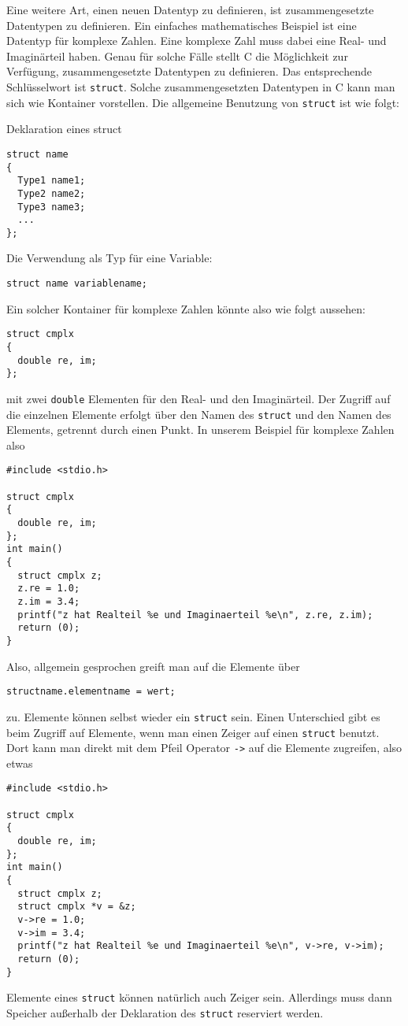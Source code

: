 Eine weitere Art, einen neuen Datentyp zu definieren, ist zusammengesetzte Datentypen zu definieren.
Ein einfaches mathematisches Beispiel ist eine Datentyp für komplexe Zahlen.
Eine komplexe Zahl muss dabei eine Real- und Imaginärteil haben.
Genau für solche Fälle stellt C die Möglichkeit zur Verfügung, zusammengesetzte Datentypen zu definieren.
Das entsprechende Schlüsselwort ist \verb|struct|.
Solche zusammengesetzten Datentypen in C kann man sich wie Kontainer vorstellen.
Die allgemeine Benutzung von \verb|struct| ist wie folgt:
\begin{myalertblock}{Deklaration eines struct}
\begin{lstlisting}
struct name
{
  Type1 name1;
  Type2 name2;
  Type3 name3;
  ...
};
\end{lstlisting}
  \vspace{-0.4cm}
  Die Verwendung als Typ für eine Variable:
\begin{lstlisting}
struct name variablename;
\end{lstlisting}
  \vspace{-0.4cm} 
\end{myalertblock}
Ein solcher Kontainer für komplexe Zahlen könnte also wie folgt aussehen:
\begin{lstlisting}
struct cmplx
{
  double re, im;
};
\end{lstlisting}
mit zwei \verb|double| Elementen für den Real- und den Imaginärteil. 
Der Zugriff auf die einzelnen Elemente erfolgt über den Namen des \verb|struct| und den Namen des Elements, getrennt durch einen Punkt.
In unserem Beispiel für komplexe Zahlen also 
\begin{lstlisting}
#include <stdio.h>

struct cmplx
{
  double re, im;
};
int main()
{
  struct cmplx z;
  z.re = 1.0;
  z.im = 3.4;
  printf("z hat Realteil %e und Imaginaerteil %e\n", z.re, z.im);
  return (0);
}
\end{lstlisting}
Also, allgemein gesprochen greift man auf die Elemente über 
\begin{lstlisting}
structname.elementname = wert;
\end{lstlisting}
zu.
Elemente können selbst wieder ein \verb|struct| sein.
Einen Unterschied gibt es beim Zugriff auf Elemente, wenn man einen Zeiger auf einen \verb|struct| benutzt.
Dort kann man direkt mit dem Pfeil Operator \verb|->| auf die Elemente zugreifen, also etwas
\begin{lstlisting}
#include <stdio.h>

struct cmplx
{
  double re, im;
};
int main()
{
  struct cmplx z;
  struct cmplx *v = &z;
  v->re = 1.0;
  v->im = 3.4;
  printf("z hat Realteil %e und Imaginaerteil %e\n", v->re, v->im);
  return (0);
}
\end{lstlisting}
Elemente eines \verb|struct| können natürlich auch Zeiger sein.
Allerdings muss dann Speicher außerhalb der Deklaration des \texttt{struct} reserviert werden.

